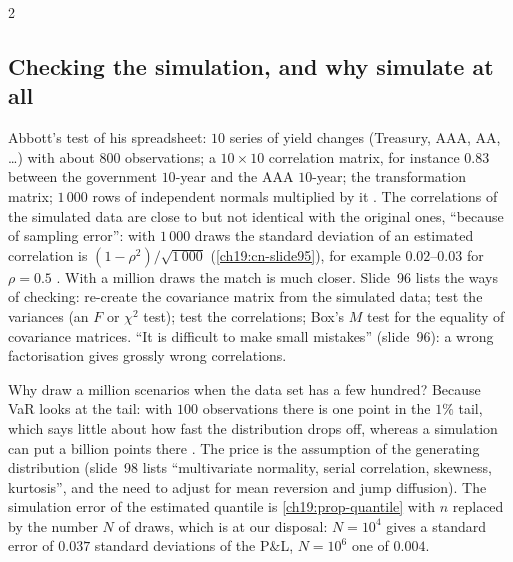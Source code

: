 \begin{paracol}{2}
\subsection{Checking the simulation, and why simulate at all}
Abbott's test of his spreadsheet: $10$ series of yield changes (Treasury, AAA, AA, \dots) with about $800$ observations; a $10\times10$ correlation matrix, for instance $0.83$ between the government $10$-year and the AAA $10$-year; the transformation matrix; $1\,000$ rows of independent normals multiplied by it . The correlations of the simulated data are close to but not identical with the original ones, ``because of sampling error'': with $1\,000$ draws the standard deviation of an estimated correlation is $(1-\rho^2)/\sqrt{1\,000}$ (\cref{ch19:cn-slide95}), for example $0.02$--$0.03$ for $\rho=0.5$ . With a million draws the match is much closer. Slide~96 lists the ways of checking: re-create the covariance matrix from the simulated data; test the variances (an $F$ or $\chi^2$ test); test the correlations; Box's $M$ test for the equality of covariance matrices. ``It is difficult to make small mistakes'' (slide~96): a wrong factorisation gives grossly wrong correlations.

Why draw a million scenarios when the data set has a few hundred? Because VaR looks at the tail: with $100$ observations there is one point in the $1\%$ tail, which says little about how fast the distribution drops off, whereas a simulation can put a billion points there . The price is the assumption of the generating distribution (slide~98 lists ``multivariate normality, serial correlation, skewness, kurtosis'', and the need to adjust for mean reversion and jump diffusion). The simulation error of the estimated quantile is \cref{ch19:prop-quantile} with $n$ replaced by the number $N$ of draws, which is at our disposal: $N=10^4$ gives a standard error of $0.037$ standard deviations of the P\&L, $N=10^6$ one of $0.004$.


\end{paracol}
